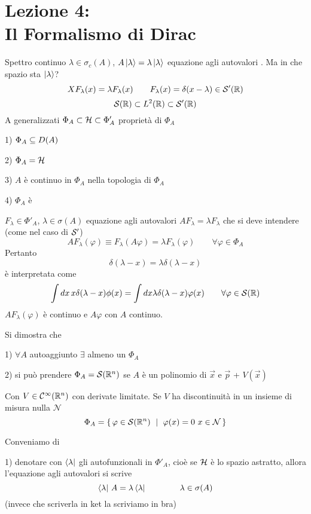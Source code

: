 \documentclass[../../FisicaTeorica.tex]{subfiles}
\begin{document}
\section{Lezione 4:\\ \large{Il Formalismo di Dirac}}
\vspace{-1em}

Spettro continuo $\lambda \in \sigma_c(A)$, $A \ket{\lambda} = \lambda \ket{\lambda}$ equazione agli autovalori .
Ma in che spazio sta $\ket\lambda$?
\[
X F_\lambda(x) = \lambda F_\lambda(x) \qquad F_\lambda(x) = \delta(x - \lambda) \in \mathcal S'(\mathbb R)
\]
\[
\mathcal S(\mathbb R) \subset L^2(\mathbb R) \subset \mathcal S'(\mathbb R)
\]
A generalizzati $\Phi_A \subset \mathcal{H} \subset \Phi'_A$ proprietà di $\Phi_A$

1) $\Phi_A \subseteq D(A)$

2) $\Phi_A = \mathcal{H}$

3) $A$ è continuo in $\Phi_A$ nella topologia di $\Phi_A$

4) $\Phi_A$ è 

$F_\lambda \in \Phi'_A$, $\lambda \in \sigma(A)$
equazione agli autovalori $A F_\lambda = \lambda F_\lambda$ che si deve intendere (come nel caso di $\mathcal S'$)
\[
A F_\lambda (\varphi) \equiv F_\lambda (A \varphi) = \lambda F_\lambda(\varphi) \qquad \forall \varphi \in \Phi_A
\]
Pertanto
\[
\delta(\lambda - x) = \lambda \delta(\lambda - x)
\]
è interpretata come
\[
\int d x \, x \delta(\lambda - x) \phi(x) = \int d x \lambda \delta(\lambda - x) \varphi(x) \qquad \forall \varphi \in \mathcal S(\mathbb R)
\]
$A F_\lambda (\varphi)$ è continuo e $A \varphi$ con $A$ continuo.

Si dimostra che

1) $\forall A$ autoaggiunto $\exists$ almeno un $\Phi_A$

2) si può prendere $\Phi_A = \mathcal S(\mathbb R^n)$ se $A$ è un polinomio di $\vec x$ e $\vec p$ + $V(\vec x)$

Con $V \in {\mathcal C}^\infty(\mathbb R^n)$ con derivate limitate. Se $V$ ha discontinuità in un insieme di misura nulla $\mathcal N$
\[
\Phi_A = \set{\varphi \in \mathcal S(\mathbb R^n) \,\, | \,\, \varphi(x) = 0 \,\, x \in \mathcal N}
\]

Conveniamo di

1) denotare con $\bra\lambda$ gli autofunzionali in $\Phi'_A$, cioè se $\mathcal{H}$ è lo spazio astratto, allora l'equazione agli autovalori si scrive
\[
\bra\lambda \, A = \lambda \bra\lambda \qquad \qquad \lambda \in \sigma(A)
\]
(invece che scriverla in ket la scriviamo in bra)
\end{document}
